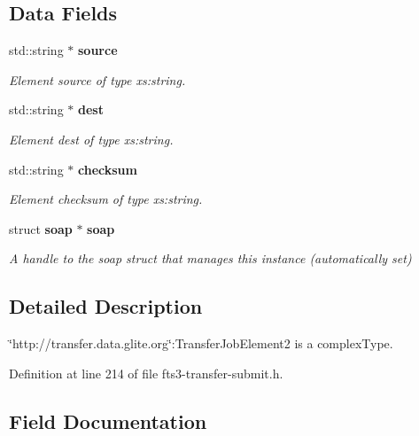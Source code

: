 \subsection*{Data Fields}
\begin{DoxyCompactItemize}
\item 
std::string $\ast$ {\bf source}
\begin{DoxyCompactList}\small\item\em Element source of type xs:string. \item\end{DoxyCompactList}\item 
std::string $\ast$ {\bf dest}
\begin{DoxyCompactList}\small\item\em Element dest of type xs:string. \item\end{DoxyCompactList}\item 
std::string $\ast$ {\bf checksum}
\begin{DoxyCompactList}\small\item\em Element checksum of type xs:string. \item\end{DoxyCompactList}\item 
struct {\bf soap} $\ast$ {\bf soap}\label{classtransfer____TransferJobElement2_a8b8db45a0818659cc38ebeaae606ce65}

\begin{DoxyCompactList}\small\item\em A handle to the soap struct that manages this instance (automatically set) \item\end{DoxyCompactList}\end{DoxyCompactItemize}


\subsection{Detailed Description}
\char`\"{}http://transfer.data.glite.org\char`\"{}:TransferJobElement2 is a complexType. 

Definition at line 214 of file fts3-\/transfer-\/submit.h.



\subsection{Field Documentation}
